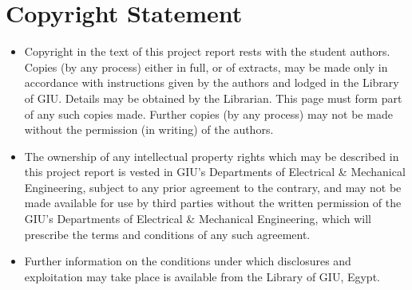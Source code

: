 \newpage
\section*{Copyright Statement}
\begin{itemize}
    \item Copyright in the text of this project report rests with the student authors. Copies (by any process) either in full, or of extracts, may be made only in accordance with instructions given by the authors and lodged in the Library of GIU. Details may be obtained by the Librarian. This page must form part of any such copies made. Further copies (by any process) may not be made without the permission (in writing) of the authors.
    \item The ownership of any intellectual property rights which may be described in this project report is vested in GIU’s Departments of Electrical \& Mechanical Engineering, subject to any prior agreement to the contrary, and may not be made available for use by third parties without the written permission of the GIU’s Departments of Electrical \& Mechanical Engineering, which will prescribe the terms and conditions of any such agreement.
    \item Further information on the conditions under which disclosures and exploitation may take place is available from the Library of GIU, Egypt.
\end{itemize}